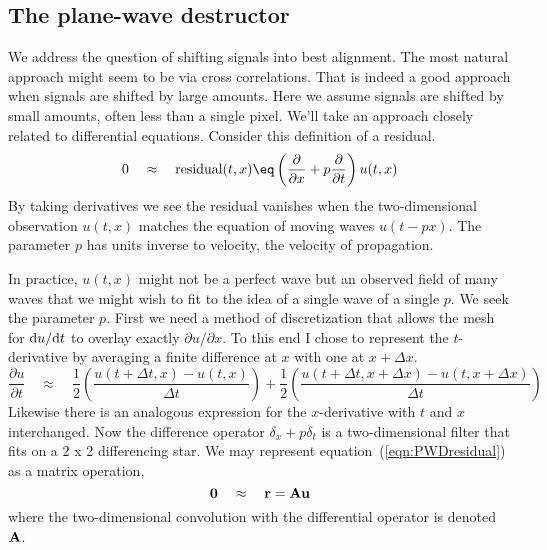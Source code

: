 %	
	
%

\subsection{The plane-wave destructor}
%
We address the question of shifting signals into best alignment. The most natural approach might seem to be via cross correlations.  That is indeed a good approach when signals are shifted by large amounts.  Here we assume signals are shifted by small amounts, often less than a single pixel.  We'll take an approach closely related to differential equations. Consider this definition of a residual. 
\begin{equation}
0 \quad \approx \quad \hbox{residual}(t,x) \eq \left( \frac{\partial}{\partial x} + p \frac{\partial}{\partial t} \right) u(t,x)
\label{eqn:PWDresidual}
\end{equation}
By taking derivatives we see the residual vanishes when the two-dimensional observation $u(t,x)$ matches the equation of moving waves $u(t-px)$.  The parameter $p$ has units inverse to velocity, the velocity of propagation. 
\par
In practice, $u(t,x)$ might not be a perfect wave but an observed field of many waves that we might wish to fit to the idea of a single wave of a single $p$. We seek the parameter $p$.  First we need a method of discretization that allows the mesh for ${\rm d}u/{\rm d}t$ to overlay exactly $\partial u /\partial x$.  To this end I chose to represent the $t$-derivative by averaging a finite difference at $x$ with one at $x+\Delta x$. 
\begin{equation}
\frac{\partial u}{\partial t} \quad \approx \quad \frac{1}{2} 
\left(
\frac{u(t+\Delta t,x) - u(t,x) }{\Delta t}
\right) + \frac{1}{2}
\left(
\frac{u(t+\Delta t,x+\Delta x) - u(t,x+\Delta x) }{\Delta t}
\right)
\end{equation}
Likewise there is an analogous expression for the $x$-derivative with $t$ and $x$ interchanged.  Now the difference operator $\delta_x + p\delta_t$ is a two-dimensional filter that fits  on a 2 x 2 differencing star.  We may represent equation~(\ref{eqn:PWDresidual}) as a matrix operation,
\begin{equation}
{\bf 0} \quad \approx\quad  {\bf r} = {\bf A}{\bf u}
\end{equation}
where the two-dimensional convolution with the differential operator is denoted ${\bf A}$.
